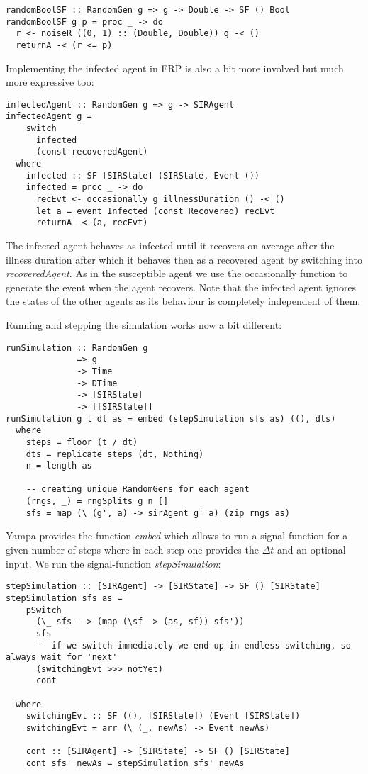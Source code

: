 \begin{verbatim}
randomBoolSF :: RandomGen g => g -> Double -> SF () Bool
randomBoolSF g p = proc _ -> do
  r <- noiseR ((0, 1) :: (Double, Double)) g -< ()
  returnA -< (r <= p)
\end{verbatim}

Implementing the infected agent in FRP is also a bit more involved but much more expressive too:

\begin{verbatim}
infectedAgent :: RandomGen g => g -> SIRAgent
infectedAgent g = 
    switch 
      infected 
      (const recoveredAgent)
  where
    infected :: SF [SIRState] (SIRState, Event ())
    infected = proc _ -> do
      recEvt <- occasionally g illnessDuration () -< ()
      let a = event Infected (const Recovered) recEvt
      returnA -< (a, recEvt)
\end{verbatim}

The infected agent behaves as infected until it recovers on average after the illness duration after which it behaves then as a recovered agent by switching into \textit{recoveredAgent}. As in the susceptible agent we use the occasionally function to generate the event when the agent recovers. Note that the infected agent ignores the states of the other agents as its behaviour is completely independent of them.

Running and stepping the simulation works now a bit different:

\begin{verbatim}
runSimulation :: RandomGen g 
              => g 
              -> Time 
              -> DTime 
              -> [SIRState] 
              -> [[SIRState]]
runSimulation g t dt as = embed (stepSimulation sfs as) ((), dts)
  where
    steps = floor (t / dt)
    dts = replicate steps (dt, Nothing)
    n = length as

	-- creating unique RandomGens for each agent
    (rngs, _) = rngSplits g n [] 
    sfs = map (\ (g', a) -> sirAgent g' a) (zip rngs as)
\end{verbatim}

Yampa provides the function \textit{embed} which allows to run a signal-function for a given number of steps where in each step one provides the $\Delta t$ and an optional input. We run the signal-function \textit{stepSimulation}:

\begin{verbatim}
stepSimulation :: [SIRAgent] -> [SIRState] -> SF () [SIRState]
stepSimulation sfs as =
    pSwitch
      (\_ sfs' -> (map (\sf -> (as, sf)) sfs'))
      sfs
      -- if we switch immediately we end up in endless switching, so always wait for 'next'
      (switchingEvt >>> notYet) 
      cont

  where
    switchingEvt :: SF ((), [SIRState]) (Event [SIRState])
    switchingEvt = arr (\ (_, newAs) -> Event newAs)

    cont :: [SIRAgent] -> [SIRState] -> SF () [SIRState]
    cont sfs' newAs = stepSimulation sfs' newAs
\end{verbatim}

